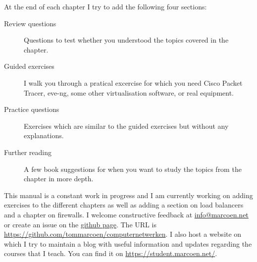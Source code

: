 At the end of each chapter I try to add the following four sections:
\begin{description}
\item[Review questions] Questions to test whether you understood the topics covered in the chapter.
\item[Guided exercises] I walk you through a pratical excercise for which you need Cisco Packet Tracer, eve-ng, some other virtualisation software, or real equipment.
\item[Practice questions] Exercises which are similar to the guided exercises but without any explanations.
\item[Further reading] A few book suggestions for when you want to study the topics from the chapter in more depth.
\end{description}

This manual is a constant work in progress and I am currently working on adding exercises to the different chapters as well as adding a section on load balancers and a chapter on firewalls.
I welcome constructive feedback at \href{mailto:info@marcoen.net}{info@\-marcoen.net} or create an issue on the \href{https://github.com/tommarcoen/computernetwerken}{github page}.
The \acs{URL} is \url{https://github.com/tommarcoen/computernetwerken}.
I also host a website on which I try to maintain a blog with useful information and updates regarding the courses that I teach.
You can find it on \url{https://student.marcoen.net/}.



